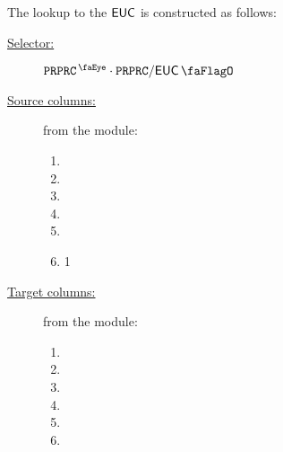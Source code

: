 The lookup to the $\textsf{EUC}$ is constructed as follows:
\begin{description}
	\item[\underline{Selector:}] $\isPreprocessing{} \cdot \ppEucFlag{}$
	\item[\underline{Source columns:}] from the \mmuMod{} module:
		\begin{multicols}{3}
			\begin{enumerate}
				\item \ppEucA{}
				\item \ppEucB{}
				\item \ppEucQuot{}
				\item \ppEucRem{}
				\item \ppEucCeil{}
				\item 1
			\end{enumerate}
		\end{multicols}
	\item[\underline{Target columns:}] from the \eucMod{} module: 
		\begin{multicols}{3}
			\begin{enumerate}
				\item \dividend{}
				\item \divisor{}
				\item \quotient{}
				\item \remainder{}
				\item \ceiling{}
				\item \done{}
			\end{enumerate} 
		\end{multicols}
\end{description}
